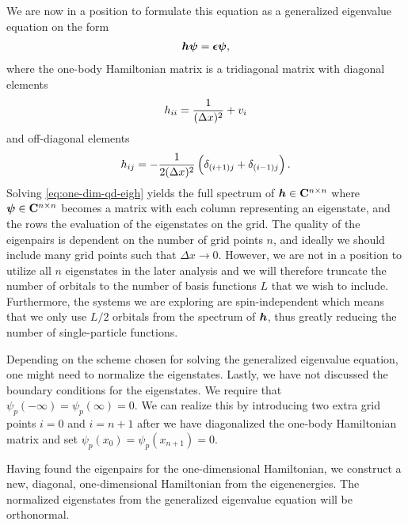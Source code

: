         We are now in a position to formulate this equation as a generalized
        eigenvalue equation on the form
        \begin{align}
            \boldsymbol{h}\boldsymbol{\psi}
            = \boldsymbol{\epsilon}\boldsymbol{\psi},
            \label{eq:one-dim-qd-eigh}
        \end{align}
        where the one-body Hamiltonian matrix is a tridiagonal matrix with
        diagonal elements
        \begin{align}
            h_{ii}
            =
            \frac{1}{(\Delta x)^2}
            + v_i
        \end{align}
        and off-diagonal elements
        \begin{align}
            h_{ij}
            = -\frac{1}{2(\Delta x)^2}\left( 
                \delta_{(i + 1) j}
                + \delta_{(i - 1) j}
             \right).
        \end{align}
        Solving \autoref{eq:one-dim-qd-eigh} yields the full spectrum of
        $\boldsymbol{h} \in \mathbf{C}^{n \times n}$ where $\boldsymbol{\psi} \in
        \mathbf{C}^{n \times n}$ becomes a matrix with each column representing
        an eigenstate, and the rows the evaluation of the eigenstates on the
        grid.
        The quality of the eigenpairs is dependent on the number of grid points
        $n$, and ideally we should include many grid points such that $\Delta x
        \to 0$.
        However, we are not in a position to utilize all $n$ eigenstates in the
        later analysis and we will therefore truncate the number of orbitals to
        the number of basis functions $L$ that we wish to include.
        Furthermore, the systems we are exploring are spin-independent which
        means that we only use $L / 2$ orbitals from the spectrum of $\boldsymbol{h}$,
        thus greatly reducing the number of single-particle functions.

        Depending on the scheme chosen for solving the generalized eigenvalue
        equation, one might need to normalize the eigenstates.
        Lastly, we have not discussed the boundary conditions for the
        eigenstates.
        We require that $\psi_p(-\infty) = \psi_p(\infty) = 0$.
        We can realize this by introducing two extra grid points $i = 0$ and $i
        = n + 1$ after we have diagonalized the one-body Hamiltonian matrix and
        set $\psi_p(x_0) = \psi_p(x_{n + 1}) = 0$.

        Having found the eigenpairs for the one-dimensional Hamiltonian, we
        construct a new, diagonal, one-dimensional Hamiltonian from the
        eigenenergies.
        The normalized eigenstates from the generalized eigenvalue equation will
        be orthonormal.


